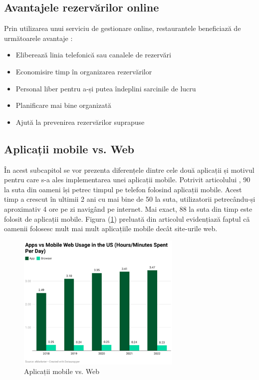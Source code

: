 \documentclass[a4paper,12pt]{book}
\begin{document}
\subsection{Avantajele rezervărilor online}
Prin utilizarea unui serviciu de gestionare online, restaurantele beneficiază de 
următoarele avantaje :
\begin{itemize}
        \item Eliberează linia telefonică sau canalele de rezervări
        \item  Economisire timp în organizarea rezervărilor
        \item Personal liber pentru a-și putea îndeplini sarcinile de lucru
        \item Planificare mai bine organizată
        \item Ajută la prevenirea rezervărilor suprapuse
    \end{itemize}
\subsection{Aplicații mobile vs. Web}
În acest subcapitol se vor prezenta diferențele dintre cele două aplicații și motivul pentru care s-a ales implementarea unei aplicații mobile. Potrivit articolului \cite{java}, 90 la suta din oameni își petrec timpul pe telefon folosind 
aplicații mobile. Acest timp a crescut în ultimii 2 ani cu mai bine de 50 la suta, utilizatorii 
petrecându-și aproximativ 4 ore pe zi navigând pe internet. Mai exact, 88 la suta din timp este 
folosit de aplicații mobile. Figura (\ref{fig:mobile})  preluată din articolul \cite{java} evidențiază faptul că oamenii folosesc mult 
mai mult aplicațiile mobile decât site-urile web.

\begin{figure}[ht]
\centering
  \includegraphics[width=0.7\textwidth]{poza3.png}
  \caption{Aplicații mobile vs. Web}
  \label{fig:mobile}
\end{figure}
\end{document}
